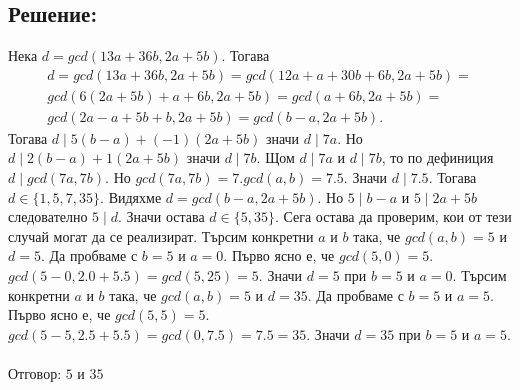 \documentclass[12pt]{article}
\begin{document}
\subsection{Решение:}
Нека \(d = gcd(13a + 36b, 2a + 5b)\). Тогава
\begin{align*}
    d = gcd(13a + 36b, 2a + 5b) = gcd(12a + a + 30b + 6b, 2a + 5b) = \\
    gcd(6(2a + 5b) + a + 6b, 2a + 5b) = gcd(a + 6b, 2a + 5b) = \\
    gcd(2a - a + 5b + b, 2a + 5b) = gcd(b - a, 2a + 5b).
\end{align*}
Тогава \(d \mid 5(b - a) + (-1)(2a + 5b)\) значи \(d \mid 7a\).
Но \(d \mid 2(b - a) + 1(2a + 5b)\) значи \(d \mid 7b\).
Щом \(d \mid 7a\) и \(d \mid 7b\), то по дефиниция \(d \mid gcd(7a, 7b)\).
Но \(gcd(7a, 7b) = 7.gcd(a, b) = 7.5\). Значи \(d \mid 7.5\).
Тогава \(d \in \{1, 5, 7, 35\}\).
Видяхме \(d = gcd(b - a, 2a + 5b)\).
Но \(5 \mid b - a\) и \(5 \mid 2a + 5b\) следователно \(5 \mid d\).
Значи остава \(d \in \{5, 35\}\).
Сега остава да проверим, кои от тези случай могат да се реализират.
Търсим конкретни \(a\) и \(b\) така, че \(gcd(a, b) = 5\) и \(d = 5\).
Да пробваме с \(b = 5\) и \(a = 0\). Първо ясно е, че \(gcd(5, 0) = 5\).
\(gcd(5 - 0, 2.0 + 5.5) = gcd(5, 25) = 5\). Значи \(d = 5\) при \(b = 5\) и \(a = 0\).
Търсим конкретни \(a\) и \(b\) така, че \(gcd(a, b) = 5\) и \(d = 35\).
Да пробваме с \(b = 5\) и \(a = 5\). Първо ясно е, че \(gcd(5, 5) = 5\).
\(gcd(5 - 5, 2.5 + 5.5) = gcd(0, 7.5) = 7.5 = 35\). Значи \(d = 35\) при \(b = 5\) и \(a = 5\).
\\
\vspace*{2mm}
\\
Отговор: \(5\) и \(35\)
\end{document}
